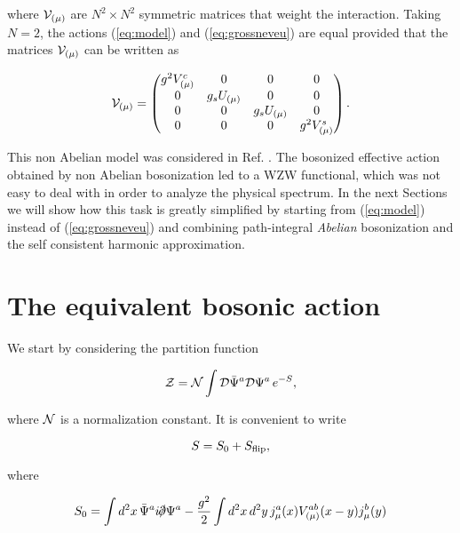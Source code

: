\documentclass[a4paper,a4paper]{article}
\begin{document}
\noindent where $\mathcal{V}_{(\mu)}$ are $N^2\times N^2$ symmetric matrices that weight the
interaction. Taking $N=2$, the actions (\ref{eq:model}) and (\ref{eq:grossneveu}) are
equal provided that the matrices $\mathcal{V}_{(\mu)}$ can be written as

\begin{equation}
\mathcal{V}_{(\mu)} =
\begin{pmatrix}
      g^2 V^c_{(\mu)} & 0 & 0 & 0 \\
      0 & g_s U_{(\mu)} & 0 & 0  \\
      0 & 0 & g_s U_{(\mu)} & 0  \\
      0 & 0 & 0 & g^2 V^s_{(\mu)} \\
\end{pmatrix}.
\end{equation}


This non Abelian model was considered in Ref. \cite{NLT1}. The bosonized effective
action obtained by non Abelian bosonization led to a WZW functional, which was not
easy to deal with in order to analyze the physical spectrum. In the next Sections we
will show how this task is greatly simplified by starting from (\ref{eq:model})
instead of (\ref{eq:grossneveu}) and combining path-integral {\em Abelian}
bosonization and the self consistent harmonic approximation.

\section{The equivalent bosonic action}

We start by considering the partition function

\begin{equation}
\mathcal{Z}=\mathcal{N}\int\mathcal{D}\bar{\Psi}^a\mathcal{D}\Psi^a\,e^{-S},
\end{equation}

\noindent where $\mathcal{N}$ is a normalization constant. It is convenient to write

\begin{equation}
S=S_0 + S_{\text{flip}},
\end{equation}

\noindent where

\begin{equation}
S_0=\int d^2x\,\PsiB^a i \slp \Psi^a - \frac{g^2}{2}\int d^2x\,d^2y\, j_\mu^a(x) V^{ab}_{(\mu)}(x-y)j_\mu^b(y)
\end{equation}
\end{document}
